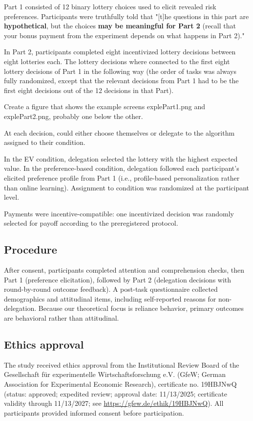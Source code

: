 \documentclass[a4paper, 12pt, fleqn]{article}
\theoremstyle{definition}
\begin{document}
Part 1 consisted of 12 binary lottery choices used to elicit revealed risk preferences. Participants were truthfully told that "[t]he questions in this part are \textbf{hypothetical}, but the choices \textbf{may be meaningful for Part 2} (recall that your bonus payment from the experiment depends on what happens in Part 2)."

In Part 2, participants completed eight incentivized lottery decisions between eight lotteries each. The lottery decisions where connected to the first eight lottery decisions of Part 1 in the following way (the order of tasks was always fully randomized, except that the relevant decisions from Part 1 had to be the first eight decisions out of the 12 decisions in that Part). 
\begin{icomm}
	Create a figure that shows the example screens explePart1.png and explePart2.png, probably one below the other.
\end{icomm} 

At each decision, could either choose themselves or delegate to the algorithm assigned to their condition.

In the EV condition, delegation selected the lottery with the highest expected value. In the preference-based condition, delegation followed each participant's elicited preference profile from Part 1 (i.e., profile-based personalization rather than online learning). Assignment to condition was randomized at the participant level.

Payments were incentive-compatible: one incentivized decision was randomly selected for payoff according to the preregistered protocol.

\subsection{Procedure}
After consent, participants completed attention and comprehension checks, then Part 1 (preference elicitation), followed by Part 2 (delegation decisions with round-by-round outcome feedback). A post-task questionnaire collected demographics and attitudinal items, including self-reported reasons for non-delegation. Because our theoretical focus is reliance behavior, primary outcomes are behavioral rather than attitudinal.

\subsection{Ethics approval}
The study received ethics approval from the Institutional Review Board of the Gesellschaft für experimentelle Wirtschaftsforschung e.V. (GfeW; German Association for Experimental Economic Research), certificate no. 19HBJNwQ (status: approved; expedited review; approval date: 11/13/2025; certificate validity through 11/13/2027; see {\footnotesize\url{https://gfew.de/ethik/19HBJNwQ}}). All participants provided informed consent before participation.
\end{document}
